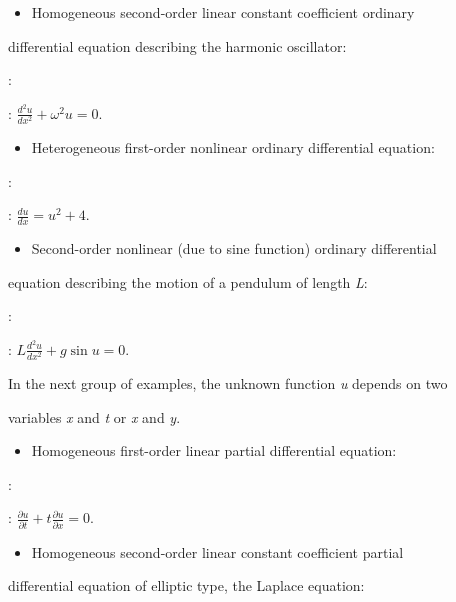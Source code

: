 \begin{itemize}
    \item Homogeneous second-order linear constant coefficient ordinary
\end{itemize}
    differential equation describing the harmonic oscillator:



:   



    :   $\frac{d^2u}{dx^2} + \omega^2u = 0.$



\begin{itemize}
    \item Heterogeneous first-order nonlinear ordinary differential equation:
\end{itemize}

:   



    :   $\frac{du}{dx} = u^2 + 4.$



\begin{itemize}
    \item Second-order nonlinear (due to sine function) ordinary differential
\end{itemize}
    equation describing the motion of a pendulum of length \textit{L}:



:   



    :   $L\frac{d^2u}{dx^2} + g\sin u = 0.$



In the next group of examples, the unknown function \textit{u} depends on two

variables \textit{x} and \textit{t} or \textit{x} and \textit{y}.



\begin{itemize}
    \item Homogeneous first-order linear partial differential equation:
\end{itemize}

:   



    :   $\frac{\partial u}{\partial t} + t\frac{\partial u}{\partial x} = 0.$



\begin{itemize}
    \item Homogeneous second-order linear constant coefficient partial
\end{itemize}
    differential equation of elliptic type, the Laplace equation:




